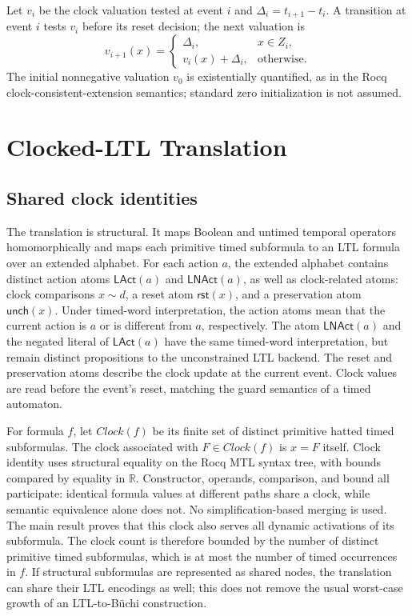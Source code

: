 \documentclass{ieeeaccess}
\newcommand{\Real}{\mathbb{R}}
\newcommand{\Reset}{\mathsf{rst}}
\newcommand{\Unch}{\mathsf{unch}}
\newcommand{\Clock}{\mathit{Clock}}
\begin{document}
Let $v_i$ be the clock valuation tested at event $i$ and
$\Delta_i=t_{i+1}-t_i$. A transition at event $i$ tests $v_i$ before its
reset decision; the next valuation is
\[
v_{i+1}(x)=
\begin{cases}
\Delta_i,&x\in Z_i,\\
v_i(x)+\Delta_i,&\text{otherwise.}
\end{cases}
\]
The initial nonnegative valuation $v_0$ is existentially quantified, as in
the Rocq clock-consistent-extension semantics; standard zero initialization
is not assumed.

\section{Clocked-LTL Translation}
\label{sec:translation}
\subsection{Shared clock identities}
The translation is structural. It maps Boolean and untimed temporal
operators homomorphically and maps each primitive timed subformula to an LTL
formula over an extended alphabet. For each action $a$, the extended
alphabet contains distinct action atoms $\mathsf{LAct}(a)$ and
$\mathsf{LNAct}(a)$, as well as clock-related atoms: clock comparisons
$x\sim d$, a reset atom
$\Reset(x)$, and a preservation atom $\Unch(x)$. Under timed-word
interpretation, the action atoms mean that the current action is $a$ or is
different from $a$, respectively. The atom $\mathsf{LNAct}(a)$ and the
negated literal of $\mathsf{LAct}(a)$ have the same timed-word interpretation,
but remain distinct propositions to the unconstrained LTL backend. The reset
and preservation atoms describe the clock update at the current event. Clock
values are read before the event's reset, matching the guard semantics of a
timed automaton.

For formula $f$, let $\Clock(f)$ be its finite set of distinct primitive
hatted timed subformulas. The clock associated with $F\in\Clock(f)$ is
$x=F$ itself. Clock identity uses structural equality on the Rocq MTL syntax
tree, with bounds compared by equality in $\Real$. Constructor, operands,
comparison, and bound all participate: identical formula values at different
paths share a clock, while semantic equivalence alone does not. No
simplification-based merging is used. The main result proves that this clock
also serves all dynamic activations of its subformula.
The clock count is therefore bounded by the number of distinct primitive
timed subformulas, which is at most the number of timed occurrences in $f$.
If structural subformulas are represented as shared nodes, the translation
can share their LTL encodings as well; this does not remove the usual
worst-case growth of an LTL-to-B\"uchi construction.
\end{document}
